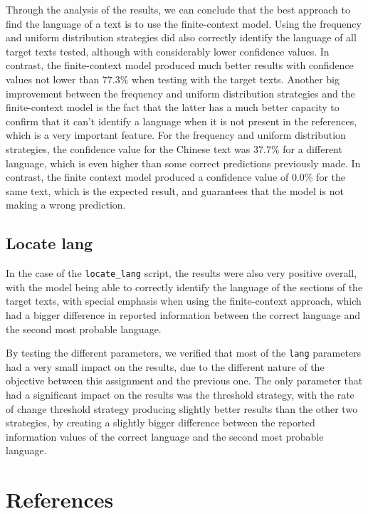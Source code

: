 \documentclass{article}
\begin{document}
Through the analysis of the results, we can conclude that the best approach to find the language of a text is to use the finite-context model.
Using the frequency and uniform distribution strategies did also correctly identify the language of all target texts tested, although with considerably lower confidence values.
In contrast, the finite-context model produced much better results with confidence values not lower than $77.3\%$ when testing with the target texts.
Another big improvement between the frequency and uniform distribution strategies and the finite-context model is the fact that the latter has a much better capacity to confirm
that it can't identify a language when it is not present in the references, which is a very important feature. For the frequency and uniform distribution strategies, the confidence
value for the Chinese text was $37.7\%$ for a different language, which is even higher than some correct predictions previously made. In contrast, the finite context model produced a
confidence value of $0.0\%$ for the same text, which is the expected result, and guarantees that the model is not making a wrong prediction.

\subsection{Locate lang}
\label{subsec:conclusion:locate_lang}

In the case of the \texttt{locate_lang} script, the results were also very positive overall, with the model being able to correctly identify the language of the sections of the target texts,
with special emphasis when using the finite-context approach, which had a bigger difference in reported information between the correct language and the second most probable language.

By testing the different parameters, we verified that most of the \texttt{lang} parameters had a very small impact on the results, due to the different nature of the objective between this
assignment and the previous one. The only parameter that had a significant impact on the results was the threshold strategy, with the rate of change threshold strategy producing
slightly better results than the other two strategies, by creating a slightly bigger difference between the reported information values of the correct language and the second most probable language.

\section{References}


\end{document}
